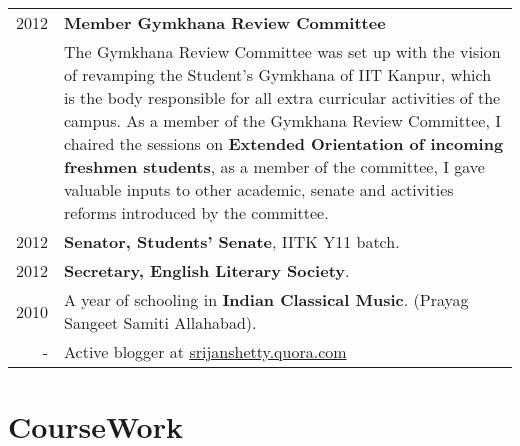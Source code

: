 \documentclass[a4paper,10pt]{article} %
\begin{document}
\begin{tabular}{rp{12cm}}
    2012 & \textbf{Member Gymkhana Review Committee}\\
         & \footnotesize{The Gymkhana Review Committee was set up with the vision of revamping the Student's Gymkhana
            of IIT Kanpur, which is the body responsible for all extra curricular activities of the campus. As a
            member of the Gymkhana Review Committee, I chaired the sessions on \textbf{Extended Orientation of
            incoming freshmen students}, as a member of the committee, I gave valuable inputs to other academic,
            senate and activities reforms introduced by the committee.}\\

    2012 & \textbf{Senator, Students' Senate}, IITK Y11 batch. \\

    2012 & \textbf{Secretary, English Literary Society}. \\

    2010 & A year of schooling in \textbf{Indian Classical Music}. (Prayag Sangeet Samiti Allahabad). \\
    -   & Active blogger at \href{srijanshetty.quora.com} {srijanshetty.quora.com} \\

\end{tabular}

\section{CourseWork}
\end{document}

